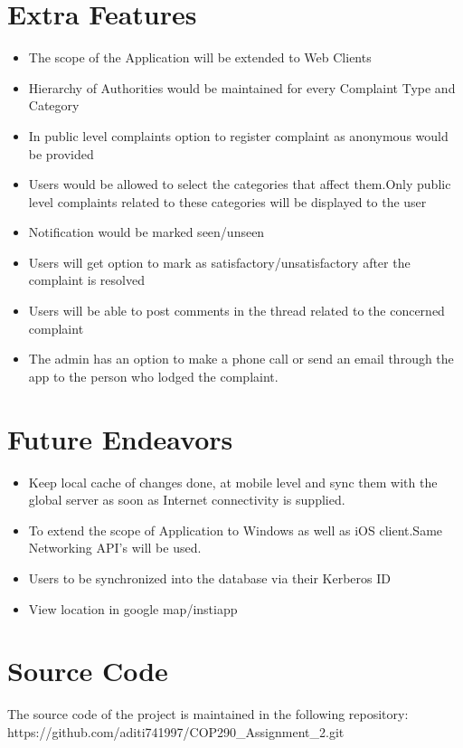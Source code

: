 \documentclass{article}
\begin{document}
	\section{Extra Features}
	\begin{itemize}
	\item The scope of the Application will be extended to Web Clients
	\item Hierarchy of Authorities would be maintained for every Complaint Type and Category
	\item In public level complaints option to register complaint as anonymous would be provided
	\item Users would be allowed to select the categories that affect them.Only public level complaints related to these categories will be displayed to the user
	\item Notification would be marked seen/unseen
	\item Users will get option to mark as satisfactory/unsatisfactory after the complaint is resolved
	\item Users will be able to post comments in the thread related to the concerned complaint
	\item The admin has an option to make a phone call or send an email through the app to the person who lodged the complaint.
	\end{itemize}

	\section{Future Endeavors} 
		\begin{itemize} 
			\item Keep local cache of changes done, at mobile level and sync them with the global server as soon as Internet connectivity is supplied.
			\item To extend the scope of Application to Windows as well as iOS client.Same Networking API's will be used.
			\item Users to be synchronized into the database via their Kerberos ID
			\item View location in google map/instiapp
		\end{itemize}   
	\section{Source Code}
	The source code of the project is maintained in the following repository: \\
	https://github.com/aditi741997/COP290\_Assignment\_2.git
	
	\medskip
	
\end{document}
